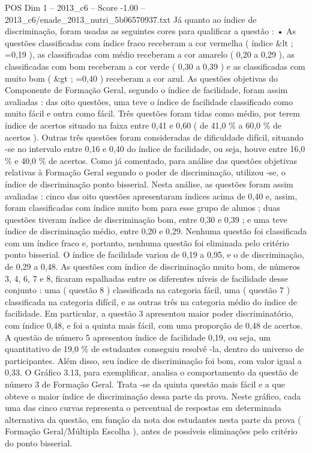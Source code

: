 \begin{textsample}{POS Dim 1 – 2013\_c6 – Score -1.00 – 2013\_c6/enade\_2013\_nutri\_5b06570937.txt}
Já quanto ao índice de discriminação, foram usadas as seguintes cores para qualificar a questão : • As questões classificadas com índice fraco receberam a cor vermelha ( índice \&lt ; =0,19 ), as classificadas com médio receberam a cor amarelo ( 0,20 a 0,29 ), as classificadas com bom receberam a cor verde ( 0,30 a 0,39 ) e as classificadas com muito bom ( \&gt ; =0,40 ) receberam a cor azul.
As questões objetivas do Componente de Formação Geral, segundo o índice de facilidade, foram assim avaliadas : das oito questões, uma teve o índice de facilidade classificado como muito fácil e outra como fácil.
Três questões foram tidas como médio, por terem índice de acertos situado na faixa entre 0,41 e 0,60 ( de 41,0 \% a 60,0 \% de acertos ).
Outras três questões foram consideradas de dificuldade difícil, situando -se no intervalo entre 0,16 e 0,40 do índice de facilidade, ou seja, houve entre 16,0 \% e 40,0 \% de acertos.
Como já comentado, para análise das questões objetivas relativas à Formação Geral segundo o poder de discriminação, utilizou -se, o índice de discriminação ponto bisserial.
Nesta análise, as questões foram assim avaliadas : cinco das oito questões apresentaram índices acima de 0,40 e, assim, foram classificadas com índice muito bom para esse grupo de alunos ; duas questões tiveram índice de discriminação bom, entre 0,30 e 0,39 ; e uma teve índice de discriminação médio, entre 0,20 e 0,29.
Nenhuma questão foi classificada com um índice fraco e, portanto, nenhuma questão foi eliminada pelo critério ponto bisserial.
O índice de facilidade variou de 0,19 a 0,95, e o de discriminação, de 0,29 a 0,48.
As questões com índice de discriminação muito bom, de números 3, 4, 6, 7 e 8, ficaram espalhadas entre os diferentes níveis de facilidade desse conjunto : uma ( questão 8 ) classificada na categoria fácil, uma ( questão 7 ) classificada na categoria difícil, e as outras três na categoria médio do índice de facilidade.
Em particular, a questão 3 apresentou maior poder discriminatório, com índice 0,48, e foi a quinta mais fácil, com uma proporção de 0,48 de acertos.
A questão de número 5 apresentou índice de facilidade 0,19, ou seja, um quantitativo de 19,0 \% de estudantes conseguiu resolvê -la, dentro do universo de participantes.
Além disso, seu índice de discriminação foi bom, com valor igual a 0,33.
O Gráfico 3.13, para exemplificar, analisa o comportamento da questão de número 3 de Formação Geral.
Trata -se da quinta questão mais fácil e a que obteve o maior índice de discriminação dessa parte da prova.
Neste gráfico, cada uma das cinco curvas representa o percentual de respostas em determinada alternativa da questão, em função da nota dos estudantes nesta parte da prova ( Formação Geral/Múltipla Escolha ), antes de possíveis eliminações pelo critério do ponto bisserial.

\end{textsample}
